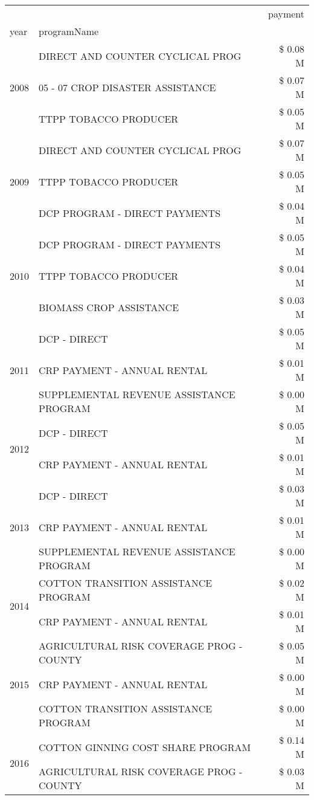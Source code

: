 \begin{tabular}{llr}
\toprule
 &  & payment \\
year & programName &  \\
\midrule
\multirow[t]{3}{*}{2008} & DIRECT AND COUNTER CYCLICAL PROG & \$ 0.08 M \\
 & 05 - 07 CROP DISASTER ASSISTANCE & \$ 0.07 M \\
 & TTPP TOBACCO PRODUCER & \$ 0.05 M \\
\cline{1-3}
\multirow[t]{3}{*}{2009} & DIRECT AND COUNTER CYCLICAL PROG & \$ 0.07 M \\
 & TTPP TOBACCO PRODUCER & \$ 0.05 M \\
 & DCP PROGRAM - DIRECT PAYMENTS & \$ 0.04 M \\
\cline{1-3}
\multirow[t]{3}{*}{2010} & DCP PROGRAM - DIRECT PAYMENTS & \$ 0.05 M \\
 & TTPP TOBACCO PRODUCER & \$ 0.04 M \\
 & BIOMASS CROP ASSISTANCE & \$ 0.03 M \\
\cline{1-3}
\multirow[t]{3}{*}{2011} & DCP - DIRECT & \$ 0.05 M \\
 & CRP PAYMENT - ANNUAL RENTAL & \$ 0.01 M \\
 & SUPPLEMENTAL REVENUE ASSISTANCE PROGRAM & \$ 0.00 M \\
\cline{1-3}
\multirow[t]{2}{*}{2012} & DCP - DIRECT & \$ 0.05 M \\
 & CRP PAYMENT - ANNUAL RENTAL & \$ 0.01 M \\
\cline{1-3}
\multirow[t]{3}{*}{2013} & DCP - DIRECT & \$ 0.03 M \\
 & CRP PAYMENT - ANNUAL RENTAL & \$ 0.01 M \\
 & SUPPLEMENTAL REVENUE ASSISTANCE PROGRAM & \$ 0.00 M \\
\cline{1-3}
\multirow[t]{2}{*}{2014} & COTTON TRANSITION ASSISTANCE PROGRAM & \$ 0.02 M \\
 & CRP PAYMENT - ANNUAL RENTAL & \$ 0.01 M \\
\cline{1-3}
\multirow[t]{3}{*}{2015} & AGRICULTURAL RISK COVERAGE PROG - COUNTY & \$ 0.05 M \\
 & CRP PAYMENT - ANNUAL RENTAL & \$ 0.00 M \\
 & COTTON TRANSITION ASSISTANCE PROGRAM & \$ 0.00 M \\
\cline{1-3}
\multirow[t]{3}{*}{2016} & COTTON GINNING COST SHARE PROGRAM & \$ 0.14 M \\
 & AGRICULTURAL RISK COVERAGE PROG - COUNTY & \$ 0.03 M \\

\end{tabular}

